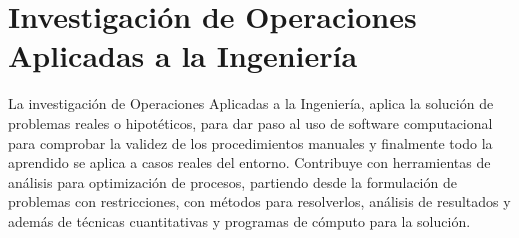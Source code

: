 \chapter{Investigación de Operaciones Aplicadas a la Ingeniería}
La investigación de Operaciones Aplicadas a la Ingeniería, aplica la solución de problemas reales o hipotéticos, para dar paso al uso de software computacional para comprobar la validez de los procedimientos manuales y finalmente todo la aprendido se aplica a casos reales del entorno. Contribuye con herramientas de análisis para optimización de procesos, partiendo desde la formulación de problemas con restricciones, con métodos para resolverlos, análisis de resultados y además de técnicas cuantitativas y programas de cómputo para la solución.





















































